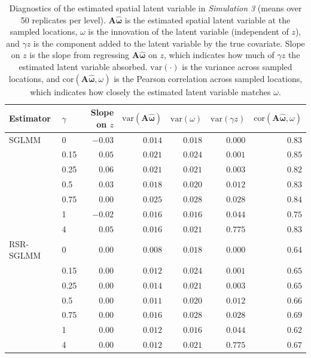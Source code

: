 \begin{table}[ht]
\centering
\small
\caption{Diagnostics of the estimated spatial latent variable in \textit{Simulation 3} (means over 50 replicates per level). $\mathbf{A}\hat{\boldsymbol{\omega}}$ is the estimated spatial latent variable at the sampled locations, $\omega$ is the innovation of the latent variable (independent of $z$), and $\gamma z$ is the component added to the latent variable by the true covariate. Slope on $z$ is the slope from regressing $\mathbf{A}\hat{\boldsymbol{\omega}}$ on $z$, which indicates how much of $\gamma z$ the estimated latent variable absorbed. $\mathrm{var}(\cdot)$ is the variance across sampled locations, and $\mathrm{cor}(\mathbf{A}\hat{\boldsymbol{\omega}}, \omega)$ is the Pearson correlation across sampled locations, which indicates how closely the estimated latent variable matches $\omega$.}
\label{tab:sim3_field}
\begin{tabular}{llrrrrr}
\toprule
Estimator & $\gamma$ & Slope on $z$ & $\mathrm{var}(\mathbf{A}\hat{\boldsymbol{\omega}})$ & $\mathrm{var}(\omega)$ & $\mathrm{var}(\gamma z)$ & $\mathrm{cor}(\mathbf{A}\hat{\boldsymbol{\omega}}, \omega)$ \\
\midrule
SGLMM & 0 & $-0.03$ & $0.014$ & $0.018$ & $0.000$ & $0.83$ \\
 & 0.15 & $0.05$ & $0.021$ & $0.024$ & $0.001$ & $0.85$ \\
 & 0.25 & $0.06$ & $0.021$ & $0.021$ & $0.003$ & $0.82$ \\
 & 0.5 & $0.03$ & $0.018$ & $0.020$ & $0.012$ & $0.83$ \\
 & 0.75 & $0.00$ & $0.025$ & $0.028$ & $0.028$ & $0.84$ \\
 & 1 & $-0.02$ & $0.016$ & $0.016$ & $0.044$ & $0.75$ \\
 & 4 & $0.05$ & $0.016$ & $0.021$ & $0.775$ & $0.83$ \\
\addlinespace
RSR-SGLMM & 0 & $0.00$ & $0.008$ & $0.018$ & $0.000$ & $0.64$ \\
 & 0.15 & $0.00$ & $0.012$ & $0.024$ & $0.001$ & $0.65$ \\
 & 0.25 & $0.00$ & $0.014$ & $0.021$ & $0.003$ & $0.65$ \\
 & 0.5 & $0.00$ & $0.011$ & $0.020$ & $0.012$ & $0.66$ \\
 & 0.75 & $0.00$ & $0.016$ & $0.028$ & $0.028$ & $0.69$ \\
 & 1 & $0.00$ & $0.012$ & $0.016$ & $0.044$ & $0.62$ \\
 & 4 & $0.00$ & $0.012$ & $0.021$ & $0.775$ & $0.67$ \\
\bottomrule
\end{tabular}
\end{table}
